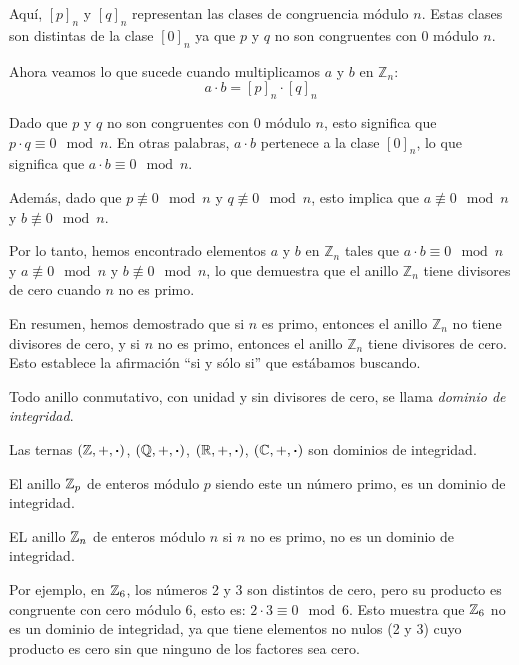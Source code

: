 \begin{fmd-proof}
\begin{itemize}
		Aquí, $[p]_n$ y $[q]_n$ representan las clases de congruencia módulo $n$. Estas clases son distintas de la clase $[0]_n$ ya que $p$ y $q$ no son congruentes con $0$ módulo $n$.
		
		Ahora veamos lo que sucede cuando multiplicamos $a$ y $b$ en $\mathbb{Z}_n$:
		\[a \cdot b = [p]_n \cdot [q]_n\]
		
		Dado que $p$ y $q$ no son congruentes con $0$ módulo $n$, esto significa que $p \cdot q \equiv 0 \mod n$. En otras palabras, $a \cdot b$ pertenece a la clase $[0]_n$, lo que significa que $a \cdot b \equiv 0 \mod n$.
		
		Además, dado que $p \not\equiv 0 \mod n$ y $q \not\equiv 0 \mod n$, esto implica que $a \not\equiv 0 \mod n$ y $b \not\equiv 0 \mod n$.
		
		Por lo tanto, hemos encontrado elementos $a$ y $b$ en $\mathbb{Z}_n$ tales que $a \cdot b \equiv 0 \mod n$ y $a \not\equiv 0 \mod n$ y $b \not\equiv 0 \mod n$, lo que demuestra que el anillo $\mathbb{Z}_n$ tiene divisores de cero cuando $n$ no es primo.
		
	\end{itemize}
	
	En resumen, hemos demostrado que si $n$ es primo, entonces el anillo $\mathbb{Z}_n$ no tiene divisores de cero, y si $n$ no es primo, entonces el anillo $\mathbb{Z}_n$ tiene divisores de cero. Esto establece la afirmación ``si y sólo si'' que estábamos buscando.
	
\end{fmd-proof}

\begin{fmd-definition}
	Todo anillo conmutativo, con unidad y sin divisores de cero, se llama \textit{dominio de integridad}.
\end{fmd-definition}

Las ternas $(\mathbb{Z}, +, \boldsymbol{\cdot})$, $(\mathbb{Q}, +, \boldsymbol{\cdot})$, $(\mathbb{R}, +, \boldsymbol{\cdot})$, $(\mathbb{C}, +, \boldsymbol{\cdot})$ son dominios de integridad.

El anillo $\mathbb{Z}_p$ de enteros módulo $p$ siendo este un número primo, es un dominio de integridad.

EL anillo $\mathbb{Z}_n$ de enteros módulo $n$ si $n$ no es primo, no es un dominio de integridad.

Por ejemplo, en $\mathbb{Z}_6$, los números 2 y 3 son distintos de cero, pero su producto es congruente con cero módulo 6, esto es: $2 \cdot 3 \equiv 0 \mod{6}$. Esto muestra que $\mathbb{Z}_6$ no es un dominio de integridad, ya que tiene elementos no nulos (2 y 3) cuyo producto es cero sin que ninguno de los factores sea cero.


